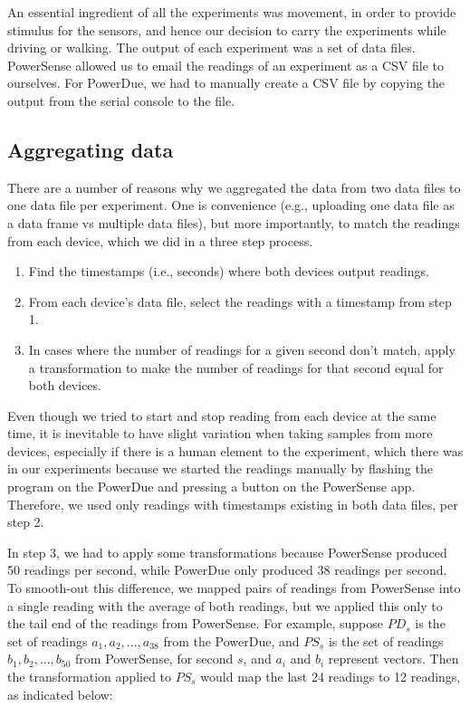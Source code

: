 \documentclass[journal]{IEEEtranTIE}
\begin{document}
An essential ingredient of all the experiments was movement, in order to provide
stimulus for the sensors, and hence our decision to carry the experiments while
driving or walking. The output of each experiment was a set of data files.
PowerSense allowed us to email the readings of an experiment as a CSV file to
ourselves. For PowerDue, we had to manually create a CSV file by copying the
output from the serial console to the file.

\subsection{Aggregating data}

There are a number of reasons why we aggregated the data from two data files to
one data file per experiment. One is convenience (e.g., uploading one data file
as a data frame vs multiple data files), but more importantly, to match the
readings from each device, which we did in a three step process.

\begin{enumerate}
\item Find the timestamps (i.e., seconds) where both devices output readings.
\item From each device's data file, select the readings with a timestamp from
      step 1.
\item In cases where the number of readings for a given second don't match,
      apply a transformation to make the number of readings for that second
      equal for both devices.
\end{enumerate}

Even though we tried to start and stop reading from each device at the same
time, it is inevitable to have slight variation when taking samples from more
devices, especially if there is a human element to the experiment, which there
was in our experiments because we started the readings manually by flashing the
program on the PowerDue and pressing a button on the PowerSense app.
Therefore, we used only readings with timestamps existing in both data files,
per step 2.

In step 3, we had to apply some transformations because PowerSense produced 50
readings per second, while PowerDue only produced 38 readings per second. To
smooth-out this difference, we mapped pairs of readings from PowerSense into a
single reading with the average of both readings, but we applied this only to
the tail end of the readings from PowerSense. For example, suppose $PD_s$ is the
set of readings $a_1, a_2, ..., a_{38}$ from the PowerDue, and $PS_s$ is the set
of readings $b_1, b_2, ..., b_{50}$ from PowerSense, for second $s$, and $a_i$
and $b_i$ represent vectors. Then the transformation applied to $PS_s$ would map
the last 24 readings to 12 readings, as indicated below:
\end{document}
